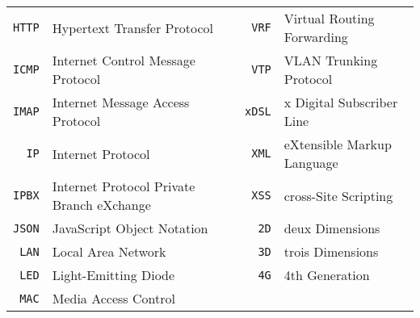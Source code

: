 \begin{tabular}{rp{6.5cm}p{0.5cm}rp{6.5cm}}
\\ 
\texttt{HTTP} & Hypertext Transfer Protocol
 & & 
\texttt{VRF} & Virtual Routing Forwarding
\\ 
\texttt{ICMP} & Internet Control Message Protocol
 & & 
\texttt{VTP} & VLAN Trunking Protocol
\\ 
\texttt{IMAP} & Internet Message Access Protocol
 & & 
\texttt{xDSL} & x Digital Subscriber Line
\\ 
\texttt{IP} & Internet Protocol
 & & 
\texttt{XML} & eXtensible Markup Language
\\ 
\texttt{IPBX} & Internet Protocol Private Branch eXchange
 & & 
\texttt{XSS} & cross-Site Scripting
\\ 
\texttt{JSON} & JavaScript Object Notation
 & & 
\texttt{2D} & deux Dimensions
\\ 
\texttt{LAN} & Local Area Network
 & & 
\texttt{3D} & trois Dimensions
\\ 
\texttt{LED} & Light-Emitting Diode
 & & 
\texttt{4G} & 4th Generation
\\ 
\texttt{MAC} & Media Access Control
 & & 
 & 
\\ 
\end{tabular}